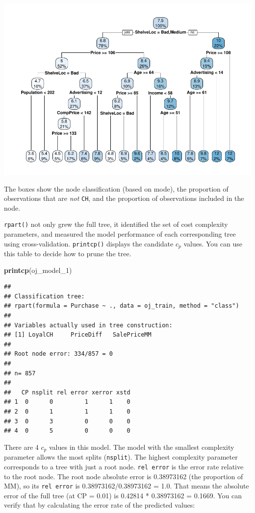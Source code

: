 \documentclass[
]{book}
\newenvironment{Shaded}{\begin{snugshade}}{\end{snugshade}}
\newcommand{\DecValTok}[1]{\textcolor[rgb]{0.00,0.00,0.81}{#1}}
\newcommand{\KeywordTok}[1]{\textcolor[rgb]{0.13,0.29,0.53}{\textbf{#1}}}
\newcommand{\NormalTok}[1]{#1}
\begin{document}
\includegraphics{data-sci_files/figure-latex/unnamed-chunk-60-1.pdf}

The boxes show the node classification (based on mode), the proportion of observations that are \emph{not} \texttt{CH}, and the proportion of observations included in the node.

\texttt{rpart()} not only grew the full tree, it identified the set of cost complexity parameters, and measured the model performance of each corresponding tree using cross-validation. \texttt{printcp()} displays the candidate \(c_p\) values. You can use this table to decide how to prune the tree.

\begin{Shaded}
\begin{Highlighting}[]
\KeywordTok{printcp}\NormalTok{(oj_model_}\DecValTok{1}\NormalTok{)}
\end{Highlighting}
\end{Shaded}

\begin{verbatim}
## 
## Classification tree:
## rpart(formula = Purchase ~ ., data = oj_train, method = "class")
## 
## Variables actually used in tree construction:
## [1] LoyalCH     PriceDiff   SalePriceMM
## 
## Root node error: 334/857 = 0
## 
## n= 857 
## 
##   CP nsplit rel error xerror xstd
## 1  0      0         1      1    0
## 2  0      1         1      1    0
## 3  0      3         0      0    0
## 4  0      5         0      0    0
\end{verbatim}

There are 4 \(c_p\) values in this model. The model with the smallest complexity parameter allows the most splits (\texttt{nsplit}). The highest complexity parameter corresponds to a tree with just a root node. \texttt{rel\ error} is the error rate relative to the root node. The root node absolute error is 0.38973162 (the proportion of MM), so its \texttt{rel\ error} is 0.38973162/0.38973162 = 1.0. That means the absolute error of the full tree (at CP = 0.01) is 0.42814 * 0.38973162 = 0.1669. You can verify that by calculating the error rate of the predicted values:
\end{document}
